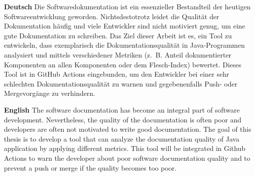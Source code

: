\textbf{Deutsch}
Die Softwaredokumentation ist ein essenzieller Bestandteil der heutigen Softwareentwicklung geworden. Nichtsdestotrotz leidet die Qualität der Dokumentation häufig und viele Entwickler sind nicht motiviert genug, um eine gute Dokumentation zu schreiben. Das Ziel dieser Arbeit ist es, ein Tool zu entwickeln, dass exemplarisch die Dokumentationsqualität in Java-Programmen analysiert und mittels verschiedener Metriken (z.~B. Anteil dokumentierter Komponenten an allen Komponenten oder dem Flesch-Index) bewertet. Dieses Tool ist in GitHub Actions eingebunden, um den Entwickler bei einer sehr schlechten Dokumentationsqualität zu warnen und gegebenenfalls Push- oder Mergevorgänge zu verhindern.

\bigskip

\noindent
\textbf{English} 
The software documentation has become an integral part of software development. Nevertheless, the quality of the documentation is often poor and developers are often not motivated to write good documentation. The goal of this thesis is to develop a tool that can analyze the documentation quality of Java application by applying different metrics. This tool will be integrated in Github Actions to warn the developer about poor software documentation quality and to prevent a push or merge if the quality becomes too poor.  

